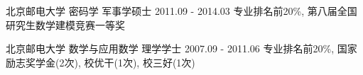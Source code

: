 

\begin{cvedus}

  \cvedu
    {北京邮电大学} %
    {密码学} %
    {军事学硕士} %
    {2011.09 - 2014.03} %
    {专业排名前20\%, 第八届全国研究生数学建模竞赛一等奖}

  \cvedu
    {北京邮电大学} %
    {数学与应用数学} %
    {理学学士} %
    {2007.09 - 2011.06} %
    {专业排名前20\%, 国家励志奖学金(2次), 校优干(1次), 校三好(1次)}

\end{cvedus}

